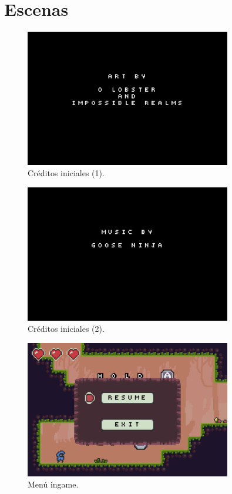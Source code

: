 \section{Escenas}\label{ap:escenas}

\begin{figure}[h]
	\centering
	\includegraphics[height=6cm]{capitulos/apendice/credits_0.png}
	\caption{Créditos iniciales (1).}\label{fig:ap_credits_0}
\end{figure}

\vspace{3cm}

\begin{figure}[h]
	\centering
	\includegraphics[height=6cm]{capitulos/apendice/credits_1.png}
	\caption{Créditos iniciales (2).}\label{fig:ap_credits_1}
\end{figure}

\begin{figure}[h]
	\centering
	\includegraphics[height=6cm]{capitulos/apendice/ingame_menu.png}
	\caption{Menú ingame.}\label{fig:ap_ingame_menu}
\end{figure}

